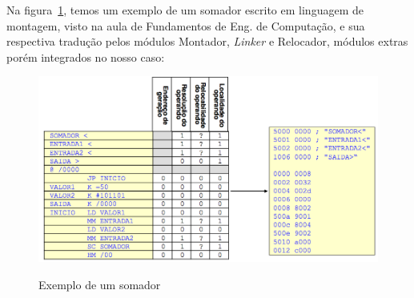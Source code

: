 Na figura~\ref{fig:exemplo-somador}, temos um exemplo de um somador escrito em linguagem de montagem, visto na aula de Fundamentos de Eng. de Computação, e sua respectiva tradução pelos módulos Montador, \emph{Linker} e Relocador, módulos extras porém integrados no nosso caso:

\begin{figure}[ht]
	\centering
	\caption{Exemplo de um somador}
	\includegraphics[width=\textwidth]{images/exemplo-somador.png}
	\label{fig:exemplo-somador}
\end{figure}
